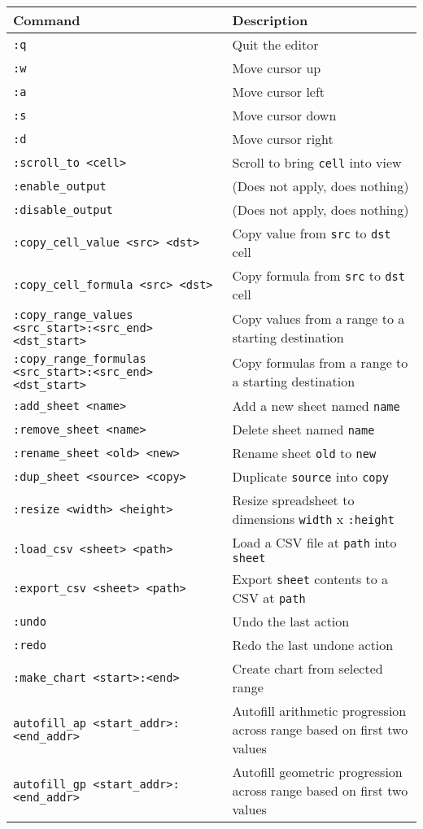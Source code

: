 \documentclass{article}
\begin{document}
\begin{tabular}{|l|p{10cm}|}
\hline
\textbf{Command} & \textbf{Description} \\
\hline
\texttt{:q} & Quit the editor  \\
\hline
\texttt{:w} & Move cursor up  \\
\texttt{:a} & Move cursor left  \\
\texttt{:s} & Move cursor down  \\
\texttt{:d} & Move cursor right  \\
\texttt{:scroll\_to <cell>} & Scroll to bring \texttt{cell} into view  \\
\texttt{:enable\_output} & (Does not apply, does nothing)  \\
\texttt{:disable\_output} & (Does not apply, does nothing)  \\
\hline
\texttt{:copy\_cell\_value <src> <dst>} & Copy value from \texttt{src} to \texttt{dst} cell  \\
\texttt{:copy\_cell\_formula <src> <dst>} & Copy formula from \texttt{src} to \texttt{dst} cell  \\
\texttt{:copy\_range\_values <src\_start>:<src\_end> <dst\_start>} & Copy values from a range to a starting destination  \\
\texttt{:copy\_range\_formulas <src\_start>:<src\_end> <dst\_start>} & Copy formulas from a range to a starting destination  \\
\hline
\texttt{:add\_sheet <name>} & Add a new sheet named \texttt{name}  \\
\texttt{:remove\_sheet <name>} & Delete sheet named \texttt{name}  \\
\texttt{:rename\_sheet <old> <new>} & Rename sheet \texttt{old} to \texttt{new}  \\
\texttt{:dup\_sheet <source> <copy>} & Duplicate \texttt{source} into \texttt{copy}  \\
\texttt{:resize <width> <height>} & Resize spreadsheet to dimensions \texttt{width} x \texttt{:height}  \\
\hline
\texttt{:load\_csv <sheet> <path>} & Load a CSV file at \texttt{path} into \texttt{sheet}  \\
\texttt{:export\_csv <sheet> <path>} & Export \texttt{sheet} contents to a CSV at \texttt{path}  \\
\hline
\texttt{:undo} & Undo the last action  \\
\texttt{:redo} & Redo the last undone action  \\
\hline
\texttt{:make\_chart <start>:<end>} & Create chart from selected range  \\
\hline
\texttt{autofill\_ap <start\_addr>:<end\_addr>} & Autofill arithmetic progression across range based on first two values  \\
\texttt{autofill\_gp <start\_addr>:<end\_addr>} & Autofill geometric progression across range based on first two values  \\
\hline
\end{tabular}
\end{document}
